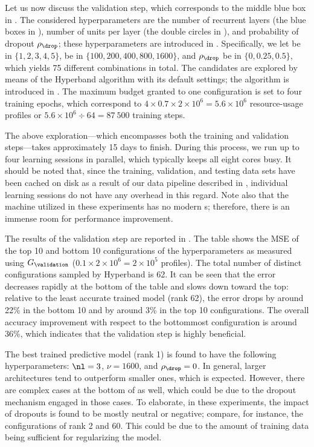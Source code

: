 Let us now discuss the validation step, which corresponds to the middle blue box
in . The considered hyperparameters are the number of
recurrent layers \nl (the blue boxes in ), number
of units per layer \nu (the double circles in ),
and probability of dropout $\rho_\drop$; these hyperparameters are introduced in
. Specifically, we let \nl be in $\{ 1, 2, 3, 4, 5
\}$, \nu be in $\{ 100, 200, 400, 800, 1600 \}$, and $\rho_\drop$ be in $\{ 0,
0.25, 0.5 \}$, which yields 75 different combinations in total. The candidates
are explored by means of the Hyperband algorithm with its default settings; the
algorithm is introduced in . The maximum budget
granted to one configuration is set to four training epochs, which correspond to
$4 \times 0.7 \times 2 \times 10^6 = 5.6 \times 10^6$ resource-usage profiles or
$5.6 \times 10^6 \div 64 = 87~500$ training steps.

The above exploration---which encompasses both the training and validation
steps---takes approximately 15 days to finish. During this process, we run up to
four learning sessions in parallel, which typically keeps all eight cores busy.
It should be noted that, since the training, validation, and testing data sets
have been cached on disk as a result of our data pipeline described in
, individual learning sessions do not have any
overhead in this regard. Note also that the machine utilized in these
experiments has no modern s; therefore, there is an immense room for
performance improvement.

The results of the validation step are reported in . The
table shows the \ac{MSE} of the top 10 and bottom 10 configurations of the
hyperparameters as measured using $G_\validation$ ($0.1 \times 2 \times 10^6 = 2
\times 10^5$ profiles). The total number of distinct configurations sampled by
Hyperband is 62. It can be seen that the error decreases rapidly at the bottom
of the table and slows down toward the top: relative to the least accurate
trained model (rank 62), the error drops by around 22\% in the bottom 10 and by
around 3\% in the top 10 configurations. The overall accuracy improvement with
respect to the bottommost configuration is around 36\%, which indicates that the
validation step is highly beneficial.

The best trained predictive model (rank 1) is found to have the following
hyperparameters: $\nl = 3$, $\nu = 1600$, and $\rho_\drop = 0$. In general,
larger architectures tend to outperform smaller ones, which is expected.
However, there are complex cases at the bottom of  as
well, which could be due to the dropout mechanism engaged in those cases. To
elaborate, in these experiments, the impact of dropouts is found to be mostly
neutral or negative; compare, for instance, the configurations of rank 2 and 60.
This could be due to the amount of training data being sufficient for
regularizing the model.

